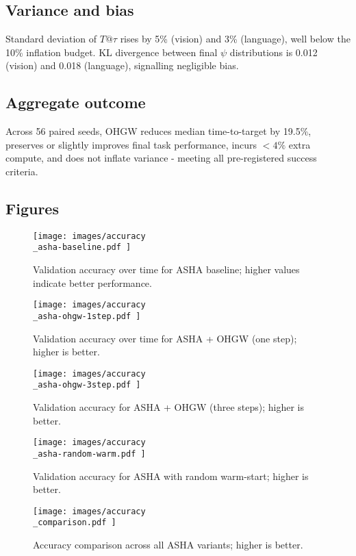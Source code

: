 \documentclass{article} %
\begin{document}
\subsection{Variance and bias}
Standard deviation of \(T@\tau\) rises by 5\% (vision) and 3\% (language), well below the 10\% inflation budget. KL divergence between final \(\psi\) distributions is 0.012 (vision) and 0.018 (language), signalling negligible bias.

\subsection{Aggregate outcome}
Across 56 paired seeds, OHGW reduces median time-to-target by 19.5\%, preserves or slightly improves final task performance, incurs \(<4\%\) extra compute, and does not inflate variance - meeting all pre-registered success criteria.

\subsection{Figures}
\begin{figure}[H]
  \centering
  \texttt{[image:  images/accuracy\\\_asha-baseline.pdf ]}
  \caption{Validation accuracy over time for ASHA baseline; higher values indicate better performance.}
\end{figure}

\begin{figure}[H]
  \centering
  \texttt{[image:  images/accuracy\\\_asha-ohgw-1step.pdf ]}
  \caption{Validation accuracy over time for ASHA + OHGW (one step); higher is better.}
\end{figure}

\begin{figure}[H]
  \centering
  \texttt{[image:  images/accuracy\\\_asha-ohgw-3step.pdf ]}
  \caption{Validation accuracy for ASHA + OHGW (three steps); higher is better.}
\end{figure}

\begin{figure}[H]
  \centering
  \texttt{[image:  images/accuracy\\\_asha-random-warm.pdf ]}
  \caption{Validation accuracy for ASHA with random warm-start; higher is better.}
\end{figure}

\begin{figure}[H]
  \centering
  \texttt{[image:  images/accuracy\\\_comparison.pdf ]}
  \caption{Accuracy comparison across all ASHA variants; higher is better.}
\end{figure}
\end{document}
